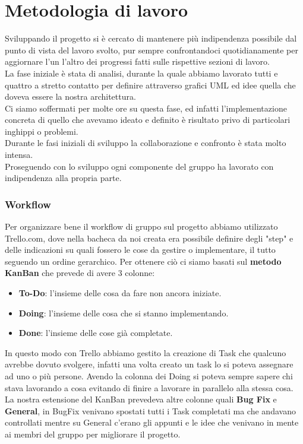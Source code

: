 \documentclass[a4paper,12pt]{report}
\begin{document}
\section{Metodologia di lavoro}

Sviluppando il progetto si è cercato di mantenere più indipendenza possibile dal punto di vista del lavoro svolto, pur sempre confrontandoci quotidianamente per aggiornare l'un l'altro dei progressi fatti sulle rispettive sezioni di lavoro.
\\
La fase iniziale è stata di analisi, durante la quale abbiamo lavorato tutti e quattro a stretto contatto per definire attraverso grafici UML ed idee quella che doveva essere la nostra architettura.
\\
Ci siamo soffermati per molte ore su questa fase, ed infatti l'implementazione concreta di quello che avevamo ideato e definito è risultato privo di particolari inghippi o problemi.
\\
Durante le fasi iniziali di sviluppo la collaborazione e confronto è stata molto intensa.
\\
Proseguendo con lo sviluppo ogni componente del gruppo ha lavorato con indipendenza alla propria parte.

\subsubsection{Workflow}
Per organizzare bene il workflow di gruppo sul progetto abbiamo utilizzato Trello.com, dove nella bacheca da noi creata era possibile definire degli "step" e delle indicazioni su quali fossero le cose da gestire o implementare, il tutto seguendo un ordine gerarchico. 
Per ottenere ciò ci siamo basati sul \textbf{metodo KanBan} che prevede di avere 3 colonne:
\begin{itemize}
    \item \textbf{To-Do}: l'insieme delle cosa da fare non ancora iniziate.
    \item \textbf{Doing}: l'insieme delle cosa che si stanno implementando.
    \item \textbf{Done}: l'insieme delle cose già completate.
\end{itemize}
In questo modo con Trello abbiamo gestito la creazione di Task che qualcuno avrebbe dovuto svolgere, infatti una volta creato un task lo si poteva assegnare ad uno o più persone.
Avendo la colonna dei Doing si poteva sempre sapere chi stava lavorando a cosa evitando di finire a lavorare in parallelo alla stessa cosa.
\
\\
La nostra estensione del KanBan prevedeva altre colonne quali \textbf{Bug Fix} e \textbf{General}, in BugFix venivano spostati tutti i Task completati ma che andavano controllati mentre su General c'erano gli appunti e le idee che venivano in mente ai membri del gruppo per migliorare il progetto.
\end{document}
